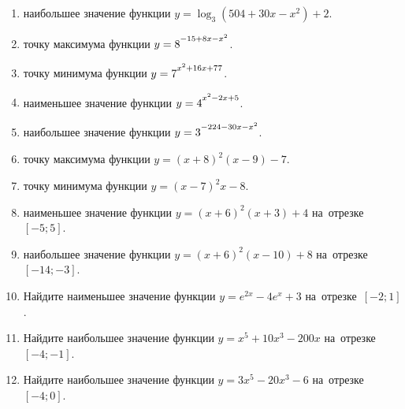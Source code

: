 \documentclass[a4paper,10pt]{article}
\begin{document}
\begin{enumerate}
\item {} наибольшее значение функции $y=\log_3\left(504+30x-x^2\right)+2$.

\item {} точку максимума функции $y=8\strut^{-15+8x-x^2}$.

\item {} точку минимума функции $y=7\strut^{x^2+16x+77}$.

\item {} наименьшее значение функции $y=4\strut^{x^2-2x+5}$.

\item {} наибольшее значение функции $y=3\strut^{-224-30x-x^2}$.

\item {} точку максимума функции $y=\left(x+8\right)^2\left(x-9\right)-7$.

\item {} точку минимума функции $y=\left(x-7\right)^2x-8$.

\item {} наименьшее значение функции $y=\left(x+6\right)^2\left(x+3\right)+4$ на~отрезке~$\left[-5;5\right]$.

\item {} наибольшее значение функции $y=\left(x+6\right)^2\left(x-10\right)+8$ на~отрезке~$\left[-14;-3\right]$.

\item Найдите наименьшее значение функции $y=e^{2x}-4e^x+3$ на~отрезке~$\left[-2;1\right]$.

\item Найдите наибольшее значение функции $y=x^5+10x^3-200x$ на~отрезке~$\left[-4;-1\right]$.

\item Найдите наибольшее значение функции $y=3x^5-20x^3-6$ на~отрезке~$\left[-4;0\right]$.

\end{enumerate}
\end{document}

